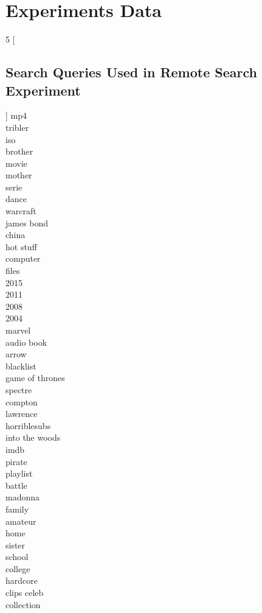\chapter{Experiments Data}

\begin{multicols}{5}
	[
	\section{Search Queries Used in Remote Search Experiment}
	]
	mp4\\
	tribler\\
	iso\\
	brother\\
	movie\\
	mother\\
	serie\\
	dance\\
	warcraft\\
	james bond\\
	china\\
	hot stuff\\
	computer\\
	files\\
	2015\\
	2011\\
	2008\\
	2004\\
	marvel\\
	audio book\\
	arrow\\
	blacklist\\
	game of thrones\\
	spectre\\
	compton\\
	lawrence\\
	horriblesubs\\
	into the woods\\
	imdb\\
	pirate\\
	playlist\\
	battle\\
	madonna\\
	family\\
	amateur\\
	home\\
	sister\\
	school\\
	college\\
	hardcore\\
	clips celeb\\
	collection\\

\end{multicols}
